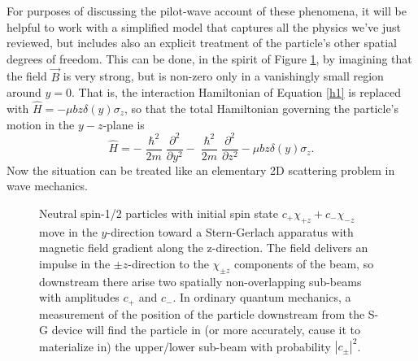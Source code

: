 \documentclass[aps,prc,onecolumn,letterpaper,floatfix,12pt]{revtex4}
\renewcommand{\hbar}{\hslash}
\begin{document}
For purposes of discussing the pilot-wave account of these phenomena,
it will be helpful to work with a simplified model that captures all
the physics we've just reviewed, but includes also an explicit
treatment of the particle's other spatial degrees of freedom.  This
can be done, in the spirit of Figure \ref{fig1}, by imagining that the
field $\vec{B}$ is very strong, but is non-zero only in a vanishingly
small region around $y=0$.  That is, the interaction Hamiltonian of
Equation \eqref{h1} is replaced with $\hat{H} = - \mu b z \delta(y)
\sigma_z$, so that the total Hamiltonian governing the particle's
motion in the $y-z$-plane is
\begin{equation}
\hat{H} = -\frac{\hbar^2}{2m} \frac{\partial^2}{\partial y^2} -
\frac{\hbar^2}{2m} \frac{\partial^2}{\partial z^2} - \mu b z \delta(y)
\sigma_z.
\end{equation}
Now the situation can be treated like an elementary 2D scattering
problem in wave mechanics.  


\begin{figure}[t]
\begin{center}
\scalebox{.85}{

}
\caption{Neutral spin-1/2 particles with initial spin state $c_+
  \chi_{+z} + c_- \chi_{-z}$ move in the $y$-direction toward a
  Stern-Gerlach apparatus with magnetic field gradient along the
  z-direction.  The field delivers an impulse in the
  $\pm z$-direction to the $\chi_{\pm z}$ components of the beam, so
  downstream there arise two spatially non-overlapping sub-beams 
with amplitudes $c_+$ and $c_-$.  In ordinary quantum mechanics,
a measurement of the position of the particle downstream from the S-G
device will find the particle in (or more accurately, cause it to
materialize in) the upper/lower sub-beam with probability
$|c_\pm|^2$. 
\label{fig1}
}
\end{center}
\end{figure}
\end{document}
